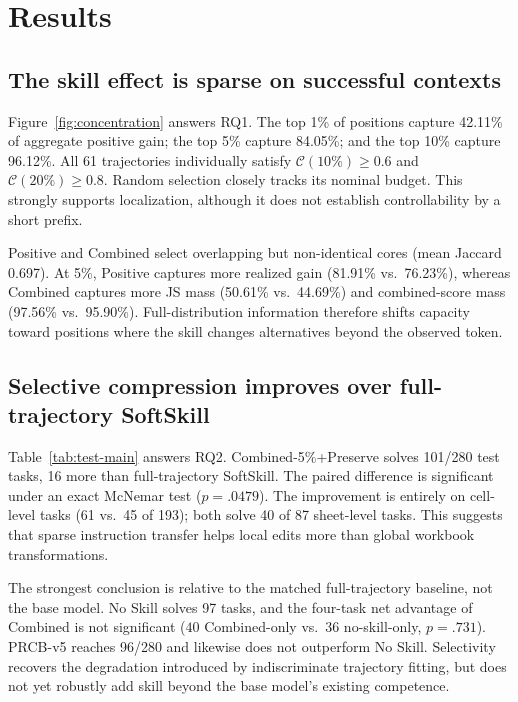 \section{Results}
\label{sec:results}

\subsection{The skill effect is sparse on successful contexts}
Figure~\ref{fig:concentration} answers RQ1.  The top 1\% of positions capture 42.11\% of aggregate positive gain; the top 5\% capture 84.05\%; and the top 10\% capture 96.12\%.  All 61 trajectories individually satisfy $\mathcal{C}(10\%)\geq 0.6$ and $\mathcal{C}(20\%)\geq 0.8$.  Random selection closely tracks its nominal budget.  This strongly supports localization, although it does not establish controllability by a short prefix.



Positive and Combined select overlapping but non-identical cores (mean Jaccard 0.697).  At 5\%, Positive captures more realized gain (81.91\% vs.\ 76.23\%), whereas Combined captures more JS mass (50.61\% vs.\ 44.69\%) and combined-score mass (97.56\% vs.\ 95.90\%).  Full-distribution information therefore shifts capacity toward positions where the skill changes alternatives beyond the observed token.

\subsection{Selective compression improves over full-trajectory SoftSkill}



Table~\ref{tab:test-main} answers RQ2.  Combined-5\%+Preserve solves 101/280 test tasks, 16 more than full-trajectory SoftSkill.  The paired difference is significant under an exact McNemar test ($p=.0479$).  The improvement is entirely on cell-level tasks (61 vs.\ 45 of 193); both solve 40 of 87 sheet-level tasks.  This suggests that sparse instruction transfer helps local edits more than global workbook transformations.

The strongest conclusion is relative to the matched full-trajectory baseline, not the base model.  No Skill solves 97 tasks, and the four-task net advantage of Combined is not significant ($40$ Combined-only vs.\ $36$ no-skill-only, $p=.731$).  PRCB-v5 reaches 96/280 and likewise does not outperform No Skill.  Selectivity recovers the degradation introduced by indiscriminate trajectory fitting, but does not yet robustly add skill beyond the base model's existing competence.

